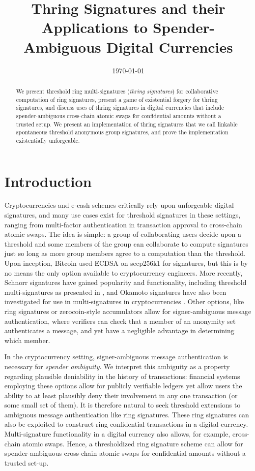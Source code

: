 \documentclass{mrl}
\title{Thring Signatures and their Applications to Spender-Ambiguous Digital Currencies}
\date{\today}
\theoremstyle{definition}
\numberwithin{theorem}{subsection}
\begin{document}

\begin{abstract}
We present threshold ring multi-signatures (\textit{thring signatures}) for collaborative computation of ring signatures, present a game of existential forgery for thring signatures, and discuss uses of thring signatures in digital currencies that include spender-ambiguous cross-chain atomic swaps for confidential amounts without a trusted setup. We present an implementation of thring signatures that we call linkable spontaneous threshold anonymous group signatures, and prove the implementation existentially unforgeable. 
\end{abstract}

\section{Introduction}


Cryptocurrencies and e-cash schemes critically rely upon unforgeable digital signatures, and many use cases exist for threshold signatures in these settings, ranging from multi-factor authentication in transaction approval to cross-chain atomic swaps. The idea is simple: a group of collaborating users decide upon a threshold and some members of the group can collaborate to compute signatures just so long as more group members agree to a computation than the threshold. Upon inception, Bitcoin used ECDSA on secp256k1 for signatures, but this is by no means the only option available to cryptocurrency engineers. More recently, Schnorr signatures \cite{schnorr1991efficient} have gained popularity and functionality, including threshold multi-signatures as presented in \cite{maxwell2018simple}, and Okamoto signatures \cite{okamoto1992provably} have also been investigated for use in multi-signatures in cryptocurrencies \cite{drijvers2018okamoto}. Other options, like ring signatures \cite{liu2004linkable} or zerocoin-style accumulators \cite{miers2013zerocoin} allow for signer-ambiguous message authentication, where verifiers can check that a member of an anonymity set authenticates a message, and yet have a negligible advantage in determining which member. 

In the cryptocurrency setting, signer-ambiguous message authentication is necessary for \textit{spender ambiguity}. We interpret this ambiguity as a property regarding plausible deniability in the history of transactions: financial systems employing these options allow for publicly verifiable ledgers yet allow users the ability to at least plausibly deny their involvement in any one transaction (or some small set of them). It is therefore natural to seek threshold extensions to ambiguous message authentication like ring signatures. These ring signatures can also be exploited to construct ring confidential transactions in a digital currency. Multi-signature functionality in a digital currency also allows, for example, cross-chain atomic swaps. Hence, a thresholdized ring signature scheme can allow for spender-ambiguous cross-chain atomic swaps for confidential amounts without a trusted set-up.
\end{document}
